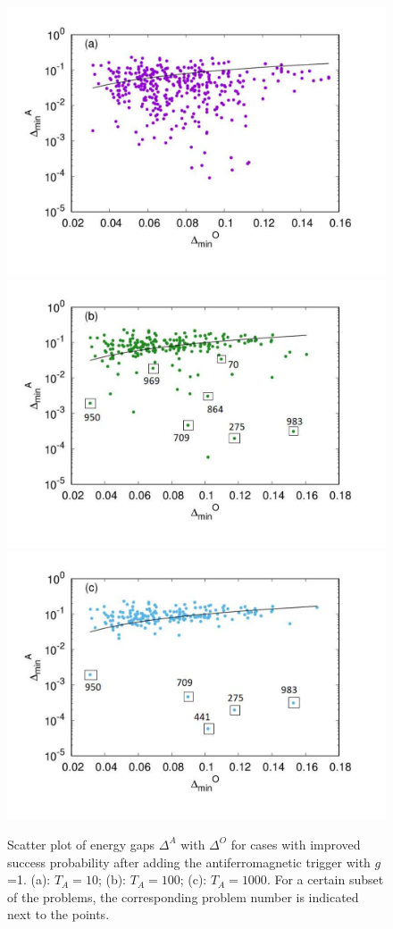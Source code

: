 \documentclass[../main.tex]{subfiles}
\begin{document}
\begin{figure}
\centering 
\includegraphics[scale=0.35]{selected_T10_g1.pdf}
\includegraphics[scale=0.35]{selected_T100_g1.pdf}
\includegraphics[scale=0.35]{selected_T1000_g1.pdf}
\caption{Scatter plot of energy gaps $\Delta^A $ with $\Delta^O$ for cases with improved success probability after adding the antiferromagnetic trigger with $g$=1. (a): $T_A=10$; (b): $T_A=100$; (c): $T_A=1000$. For a certain subset of the problems, the corresponding problem number is indicated next to the points.}
\label{fig:a23}
\end{figure}
\end{document}
